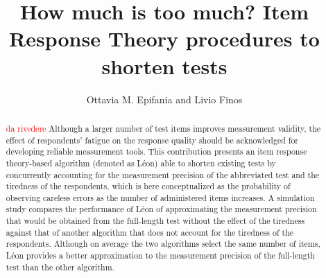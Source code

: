 \documentclass{svproc}
\newcommand{\ottavia}[1]{\textcolor{red}{#1}}
\begin{document}
\mainmatter              %
%
\title{How much is too much? Item Response Theory procedures to shorten tests}
%
%
\author{Ottavia M. Epifania and Livio Finos}
%
%
%

\maketitle              %

\begin{abstract}
\ottavia{da rivedere}
Although a larger number of test items improves measurement validity, the effect of respondents’ fatigue on the response quality should be acknowledged for developing reliable measurement tools.  This contribution presents an item response theory-based algorithm (denoted as Léon) able to shorten existing tests by concurrently accounting for the measurement precision of the abbreviated test and the tiredness of the respondents, which is here conceptualized as the probability of observing careless errors as the number of administered items increases. A simulation study compares the performance of Léon of approximating the measurement precision that would be obtained from the full-length test without the effect of the tiredness against that of another algorithm that does not account for the tiredness of the respondents. Although on average the two algorithms select the same number of items, Léon provides a better approximation to the measurement precision of the full-length test than the other algorithm.  
\end{abstract}
%
\end{document}
